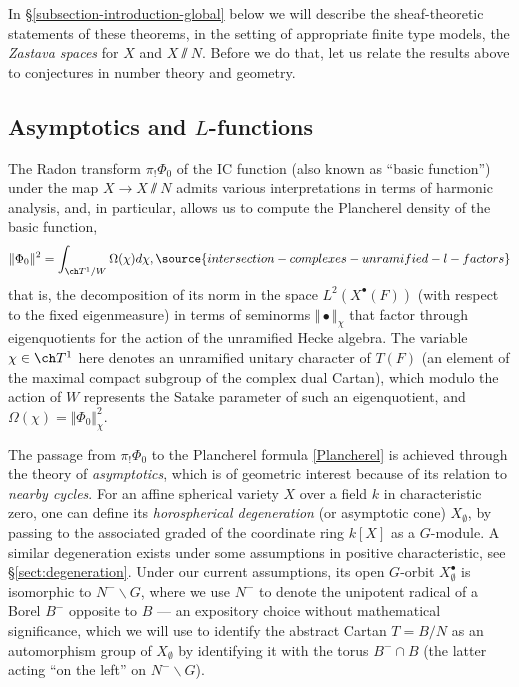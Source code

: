 In \S \ref{subsection-introduction-global} below we will describe the sheaf-theoretic statements of these theorems, in the setting of appropriate finite type models, the \emph{Zastava spaces} for $X$ and $X\sslash N$. Before we do that, let us relate the results above to conjectures in number theory and geometry.


\subsection{Asymptotics and $L$-functions}

The Radon transform $\pi_! \Phi_0$ of the IC function (also known as ``basic function'') under the map $X\to X\sslash N$ admits various interpretations in terms of harmonic analysis, and, in particular,  allows us to compute the Plancherel density of the basic function,
\begin{equation}\label{Plancherel} \Vert \Phi_0 \Vert^2 = \int_{\ch T^1/W} \Omega(\chi) d\chi,
\source{intersection-complexes-unramified-l-factors}
\end{equation}
that is, the decomposition of its norm in the space $L^2(X^\bullet(F))$ (with respect to the fixed eigenmeasure) in terms of seminorms $\Vert \bullet \Vert_\chi$ that factor through eigenquotients for the action of the unramified Hecke algebra. The variable $\chi\in \ch T^1$ here denotes an unramified unitary character of $T(F)$ (an element of the maximal compact subgroup of the complex dual Cartan), which modulo the action of $W$ represents the Satake parameter of such an eigenquotient, and $\Omega(\chi) = \Vert \Phi_0\Vert^2_\chi$.

The passage from $\pi_! \Phi_0$ to the Plancherel formula \eqref{Plancherel} is achieved through the theory of \emph{asymptotics}, which is of geometric interest because of its relation to \emph{nearby cycles}. For an affine spherical variety $X$ over a field $k$ in characteristic zero, one can define its \emph{horospherical degeneration} (or asymptotic cone) $X_\emptyset$, by passing to the associated graded of the coordinate ring $k[X]$ as a $G$-module. A similar degeneration exists under some assumptions in positive characteristic, see \S\ref{sect:degeneration}. Under our current assumptions, its open $G$-orbit $X_\emptyset^\bullet$ is isomorphic to $N^-\backslash G$, where we use $N^-$ to denote the unipotent radical of a Borel $B^-$ opposite to $B$ --- an expository choice
without mathematical significance, which we will use to identify the abstract Cartan $T=B/N$ as an automorphism group of $X_\emptyset$ by identifying it with the torus $B^-\cap B$ (the latter acting ``on the left'' on $N^-\backslash G$).

